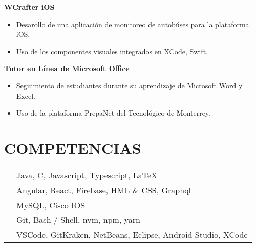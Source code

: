 \documentclass{res}
\begin{document}
\begin{resume}
    \textbf{WCrafter iOS} 
    \begin{itemize}
        \item Desarollo de una aplicación de monitoreo de autobúses para la plataforma iOS.
        \item Uso de los componentes visuales integrados en XCode, Swift.
    \end{itemize}

    \textbf{Tutor en Línea de Microsoft Office} 
    \begin{itemize}
        \item Seguimiento de estudiantes durante su aprendizaje de Microsoft Word y Excel.
        \item Uso de la plataforma PrepaNet del Tecnológico de Monterrey.
    \end{itemize}

    \section{\large{COMPETENCIAS}} 
    \begin{tabularx}{15cm}{SB}
         &
        Java, C, Javascript, Typescript, LaTeX
        \\
         &
        Angular, React, Firebase, HML \& CSS, Graphql
        \\
         &
        MySQL, Cisco IOS
        \\
         &
        Git, Bash / Shell, nvm, npm, yarn
        \\
         &
        VSCode, GitKraken, NetBeans, Eclipse, Android Studio, XCode
    \end{tabularx}
\end{resume}
\end{document}
